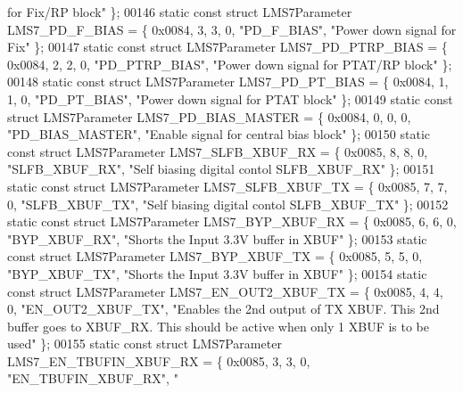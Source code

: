 \begin{DoxyCode}
{       for Fix/RP block"} \};
00146 \textcolor{keyword}{static} \textcolor{keyword}{const} \textcolor{keyword}{struct }LMS7Parameter LMS7_PD_F_BIAS = \{ 0x0084, 3, 3, 0, \textcolor{stringliteral}{"PD\_F\_BIAS"}, \textcolor{stringliteral}{"Power down signal for
       Fix"} \};
00147 \textcolor{keyword}{static} \textcolor{keyword}{const} \textcolor{keyword}{struct }LMS7Parameter LMS7_PD_PTRP_BIAS = \{ 0x0084, 2, 2, 0, \textcolor{stringliteral}{"PD\_PTRP\_BIAS"}, \textcolor{stringliteral}{"Power down signal
       for PTAT/RP block"} \};
00148 \textcolor{keyword}{static} \textcolor{keyword}{const} \textcolor{keyword}{struct }LMS7Parameter LMS7_PD_PT_BIAS = \{ 0x0084, 1, 1, 0, \textcolor{stringliteral}{"PD\_PT\_BIAS"}, \textcolor{stringliteral}{"Power down signal for
       PTAT block"} \};
00149 \textcolor{keyword}{static} \textcolor{keyword}{const} \textcolor{keyword}{struct }LMS7Parameter LMS7_PD_BIAS_MASTER = \{ 0x0084, 0, 0, 0, \textcolor{stringliteral}{"PD\_BIAS\_MASTER"}, \textcolor{stringliteral}{"Enable signal
       for central bias block"} \};
00150 \textcolor{keyword}{static} \textcolor{keyword}{const} \textcolor{keyword}{struct }LMS7Parameter LMS7_SLFB_XBUF_RX = \{ 0x0085, 8, 8, 0, \textcolor{stringliteral}{"SLFB\_XBUF\_RX"}, \textcolor{stringliteral}{"Self biasing
       digital contol SLFB\_XBUF\_RX"} \};
00151 \textcolor{keyword}{static} \textcolor{keyword}{const} \textcolor{keyword}{struct }LMS7Parameter LMS7_SLFB_XBUF_TX = \{ 0x0085, 7, 7, 0, \textcolor{stringliteral}{"SLFB\_XBUF\_TX"}, \textcolor{stringliteral}{"Self biasing
       digital contol SLFB\_XBUF\_TX"} \};
00152 \textcolor{keyword}{static} \textcolor{keyword}{const} \textcolor{keyword}{struct }LMS7Parameter LMS7_BYP_XBUF_RX = \{ 0x0085, 6, 6, 0, \textcolor{stringliteral}{"BYP\_XBUF\_RX"}, \textcolor{stringliteral}{"Shorts the Input
       3.3V buffer in XBUF"} \};
00153 \textcolor{keyword}{static} \textcolor{keyword}{const} \textcolor{keyword}{struct }LMS7Parameter LMS7_BYP_XBUF_TX = \{ 0x0085, 5, 5, 0, \textcolor{stringliteral}{"BYP\_XBUF\_TX"}, \textcolor{stringliteral}{"Shorts the Input
       3.3V buffer in XBUF"} \};
00154 \textcolor{keyword}{static} \textcolor{keyword}{const} \textcolor{keyword}{struct }LMS7Parameter LMS7_EN_OUT2_XBUF_TX = \{ 0x0085, 4, 4, 0, \textcolor{stringliteral}{"EN\_OUT2\_XBUF\_TX"}, \textcolor{stringliteral}{"Enables the
       2nd output of TX XBUF. This 2nd buffer goes to XBUF\_RX. This should be active when only 1 XBUF is to be
       used"} \};
00155 \textcolor{keyword}{static} \textcolor{keyword}{const} \textcolor{keyword}{struct }LMS7Parameter LMS7_EN_TBUFIN_XBUF_RX = \{ 0x0085, 3, 3, 0, \textcolor{stringliteral}{"EN\_TBUFIN\_XBUF\_RX"}, \textcolor{stringliteral}{"
}
\end{DoxyCode}
